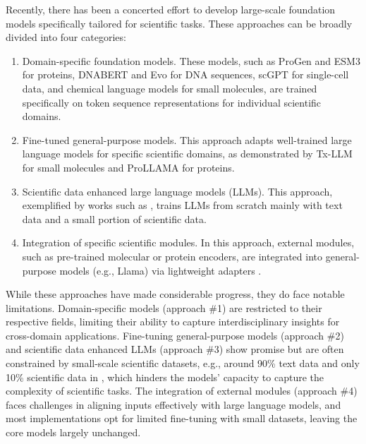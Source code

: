 Recently, there has been a concerted effort to develop large-scale foundation models specifically tailored for scientific tasks. These approaches can be broadly divided into four categories:
\begin{enumerate}
\item Domain-specific foundation models. These models, such as ProGen \cite{ProGen} and ESM3 \cite{esm3} for proteins, DNABERT \cite{zhou2024dnabert2} and Evo \cite{evo2024science} for DNA sequences, scGPT \cite{Cui2024scgpt} for single-cell data, and chemical language models \cite{liu2023molxpt,segler2018generating} for small molecules, are trained specifically on token sequence representations for individual scientific domains.
\item Fine-tuned general-purpose models. This approach adapts well-trained large language models for specific scientific domains, as demonstrated by Tx-LLM \cite{chaves2024tx} for small molecules and ProLLAMA \cite{lv2024prollamaproteinlanguagemodel} for proteins.
\item Scientific data enhanced large language models (LLMs). This approach, exemplified by works such as  \cite{BioGPT2022Luo,liu2023molxpt,galactica2022}, trains LLMs from scratch mainly with text data and a small portion of scientific data.
\item Integration of specific scientific modules. In this approach, external modules, such as pre-trained molecular or protein encoders, are integrated into general-purpose models (e.g., Llama) via lightweight adapters \cite{drugchat,proteinchat}.
\end{enumerate}

While these approaches have made considerable progress, they do face notable limitations. Domain-specific models (approach \#1) are restricted to their respective fields, limiting their ability to capture interdisciplinary insights for cross-domain applications. Fine-tuning general-purpose models (approach \#2) and scientific data enhanced LLMs (approach \#3) show promise but are often constrained by small-scale scientific datasets, e.g., around 90\% text data and only 10\% scientific data in \cite{galactica2022}, which hinders the models' capacity to capture the complexity of scientific tasks. The integration of external modules (approach \#4) faces challenges in aligning inputs effectively with large language models, and most implementations opt for limited fine-tuning with small datasets, leaving the core models largely unchanged.

